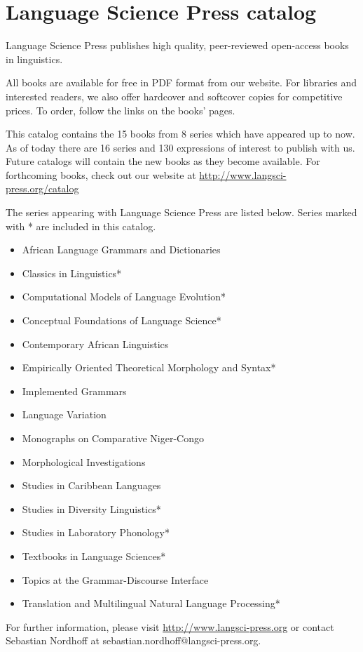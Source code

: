 \hspace{2cm}
\parbox{.8\textwidth}{
\setlength{\parindent}{6pt}
\chapter{Language Science Press catalog}
\large
Language Science Press publishes high quality, peer-reviewed open-access books in linguistics. 

All books are available for free in PDF format from our website. For libraries and interested readers, we also offer hardcover and softcover copies for competitive prices. To order, follow the links on the books' pages. 

This catalog contains the 15 books from 8 series which have appeared up to now. As of today there are 16 series and 130 expressions of interest to publish with us. Future catalogs will contain the new books as they become available. For forthcoming books, check out our website at \url{http://www.langsci-press.org/catalog}

The series appearing with Language Science Press are listed below. Series marked with * are included in this catalog.

\begin{itemize}
\item African Language Grammars and Dictionaries
\item Classics in Linguistics*
\item Computational Models of Language Evolution*
\item Conceptual Foundations of Language Science*
\item Contemporary African Linguistics
\item Em­pir­i­cal­ly Ori­ent­ed The­o­ret­i­cal Mor­phol­o­gy and Syn­tax*
\item Implemented Grammars
\item Language Variation
\item Monographs on Comparative Niger-Congo
\item Morphological Investigations
\item Studies in Caribbean Languages
\item Studies in Diversity Linguistics*
\item Studies in Laboratory Phonology*
\item Textbooks in Language Sciences*
\item Topics at the Grammar-Discourse Interface
\item Translation and Multilingual Natural Language Processing*
\end{itemize}

For further information, please visit \url{http://www.langsci-press.org} or contact Sebastian Nordhoff at sebastian.nordhoff@langsci-press.org.
}


